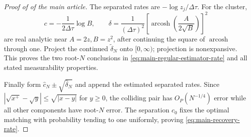 \begin{proof}[Proof of  of the main article]
The separated rates are \(-\log z_j/\Delta\tau\).  For the cluster,
\[
 c=-\frac1{2\Delta\tau}\log B,
 \qquad
 \delta=\frac1{(\Delta\tau)^2}
 \left[\operatorname{arcosh}\left(\frac A{2\sqrt B}\right)\right]^2
\tag{E10}\label{eq:e10-supp}
\]
are real analytic near \(A=2z,B=z^2\), after continuing the square of
\(\operatorname{arcosh}\) through one.  Project the continued
\(\widetilde\delta_N\) onto \([0,\infty)\); projection is nonexpansive.
This proves the two root-\(N\) conclusions in \eqref{eq:main-regular-estimator-rate} and all stated
measurability properties.

Finally form \(\widehat c_N\pm\sqrt{\widehat\delta_N}\) and append the
estimated separated rates.  Since
\(|\sqrt{x^+}-\sqrt y|\le\sqrt{|x-y|}\) for \(y\ge0\), the colliding pair
has \(O_P(N^{-1/4})\) error while all other components have root-\(N\) error.
The separation \(c_0\) fixes the optimal matching with probability tending to
one uniformly, proving \eqref{eq:main-recovery-rate}.
\end{proof}
